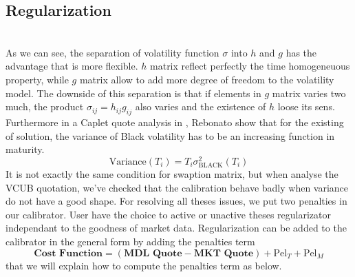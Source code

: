 \documentclass[a4paper,10pt]{article}
\begin{document}
\subsection{Regularization}\mbox{} \\
As we can see, the separation of volatility function $\sigma$ into $h$ and $g$ has the advantage that is more flexible. $h$ matrix reflect perfectly the time homogeneuous property, while $g$ matrix allow to add more degree of freedom to the volatility model. The downside of this separation is that if elements in $g$ matrix varies two much, the product $\sigma_{ij}=h_{ij}g_{ij}$ also varies and the existence of $h$ loose its sens. Furthermore in a Caplet quote analysis in \cite{REBONATO2002}, Rebonato show that for the existing of solution, the variance of Black volatility has to be an increasing function in maturity. 
\[
\text{Variance}(T_i) = T_i \sigma^2_{\text{BLACK}}(T_i)
\]
It is not exactly the same condition for swaption matrix, but when analyse the VCUB quotation, we've checked that the calibration behave badly when variance do not have a good shape. For resolving all theses issues, we put two penalties in our calibrator. User have the choice to active or unactive theses regularizator independant to the goodness of market data. Regularization can be added to the calibrator in the general form by adding the penalties term
\[
	\textbf{Cost Function} = (\textbf{MDL Quote} - \textbf{MKT Quote}) + \text{Pel}_{T} + \text{Pel}_{M}
\]
that we will explain how to compute the penalties term as below.  
\end{document}
